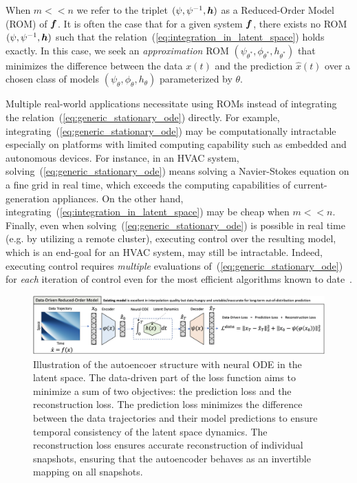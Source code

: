 When $m << n$ we refer to the triplet $(\psi, \psi^{-1}, \boldsymbol{h})$ as a Reduced-Order Model (ROM) of $\boldsymbol{f}$. It is often the case that for a given system $\boldsymbol{f}$, there exists no ROM $(\psi, \psi^{-1}, \boldsymbol{h})$ such that the relation~(\ref{eq:integration_in_latent_space}) holds exactly. In this case, we seek an \textit{approximation} ROM $(\psi_{\theta^*}, \phi_{\theta^*}, h_{\theta^*})$ that minimizes the difference between the data $x(t)$ and the prediction $\hat{x}(t)$ over a chosen class of models $(\psi_\theta, \phi_\theta, h_\theta)$ parameterized by $\theta$.

Multiple real-world applications necessitate using ROMs instead of integrating the relation~(\ref{eq:generic_stationary_ode}) directly. For example, integrating~(\ref{eq:generic_stationary_ode}) may be computationally intractable especially on platforms with limited computing capability such as embedded and autonomous devices. For instance, in an HVAC system, solving~(\ref{eq:generic_stationary_ode}) means solving a Navier-Stokes equation on a fine grid in real time, which exceeds the computing capabilities of current-generation appliances. On the other hand, integrating~(\ref{eq:integration_in_latent_space}) may be cheap when $m << n$. Finally, even when solving~(\ref{eq:generic_stationary_ode}) is possible in real time (e.g. by utilizing a remote cluster), executing control over the resulting model, which is an end-goal for an HVAC system, may still be intractable. Indeed, executing control requires \textit{multiple} evaluations of~(\ref{eq:generic_stationary_ode}) for \textit{each} iteration of control even for the most efficient algorithms known to date~\citep{duriez2017machine}. 

\begin{figure}
    \centering
    \includegraphics[width=\textwidth]{figures/abstract_data_driven.png}
    \caption{Illustration of the autoencoer structure with neural ODE in the latent space. The data-driven part of the loss function aims to minimize a sum of two objectives: the prediction loss and the reconstruction loss. The prediction loss minimizes the difference between the data trajectories and their model predictions to ensure temporal consistency of the latent space dynamics. The reconstruction loss ensures accurate reconstruction of individual snapshots, ensuring that the autoencoder behaves as an invertible mapping on all snapshots.}
    \label{fig:data_driven_loss}
\end{figure}

